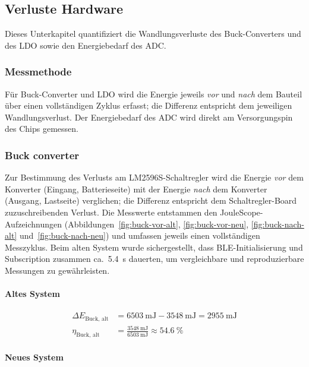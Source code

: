 \documentclass[12pt,a4paper]{article}
\begin{document}

	\subsection{Verluste Hardware}
	Dieses Unterkapitel quantifiziert die Wandlungsverluste des Buck-Converters und des LDO sowie den Energiebedarf des ADC.
	\subsubsection{Messmethode}
	Für Buck-Converter und LDO wird die Energie jeweils \emph{vor} und \emph{nach} dem Bauteil über einen vollständigen Zyklus erfasst; die Differenz entspricht dem jeweiligen Wandlungsverlust.
	Der Energiebedarf des ADC wird direkt am Versorgungspin des Chips gemessen.
	
	\subsubsection{Buck converter}\label{sub:Buck}

	Zur Bestimmung des Verlusts am LM2596S-Schaltregler wird die Energie \emph{vor} dem Konverter (Eingang, Batterieseite) mit der Energie \emph{nach} dem Konverter (Ausgang, Lastseite) verglichen; die Differenz entspricht dem Schaltregler-Board zuzuschreibenden Verlust.
	Die Messwerte entstammen den JouleScope-Aufzeichnungen
	(Abbildungen~\ref{fig:buck-vor-alt}, \ref{fig:buck-vor-neu},
	\ref{fig:buck-nach-alt} und~\ref{fig:buck-nach-neu})
	und umfassen jeweils einen vollständigen Messzyklus.
	Beim alten System wurde sichergestellt, dass BLE-Initialisierung und Subscription zusammen ca.\ \SI{5.4}{\second} dauerten, um vergleichbare und reproduzierbare Messungen zu gewährleisten.

	\paragraph{Altes System}

	\begin{align}
		\Delta E_{\text{Buck, alt}} &= \SI{6503}{\milli\joule} - \SI{3548}{\milli\joule} = \SI{2955}{\milli\joule} \\
		\eta_{\text{Buck, alt}} &= \frac{\SI{3548}{\milli\joule}}{\SI{6503}{\milli\joule}} \approx \SI{54.6}{\percent}
	\end{align}

	\paragraph{Neues System}
\end{document}
